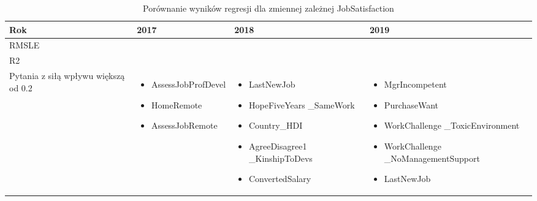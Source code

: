 \noindent\begin{minipage}{\textwidth}
             \begin{table}[H]
                 \raggedright\caption{Porównanie wyników regresji dla zmiennej zależnej JobSatisfaction\label{tabela:JobSatisfactionRegression}}
                 \begin{center}
                     \begin{tabular}{|P{.1\textwidth}|P{.26\textwidth}|P{.26\textwidth}|P{.26\textwidth}|}

                         \hline
                         Rok   & 2017             & 2018             & 2019             \\
                         \hline
                         RMSLE &  &  &  \\
                         \hline
                         R2    &    &    &    \\
                         \hline
                         Pytania z siłą wpływu większą od 0.2 &
                         \begin{itemize}
                             \item AssessJobProfDevel
                             \item HomeRemote
                             \item AssessJobRemote
                         \end{itemize} &
                         \begin{itemize}
                             \item LastNewJob
                             \item HopeFiveYears \_SameWork
                             \item Country\_HDI
                             \item AgreeDisagree1 \_KinshipToDevs
                             \item ConvertedSalary
                         \end{itemize} &
                         \begin{itemize}
                             \item MgrIncompetent
                             \item PurchaseWant
                             \item WorkChallenge \_ToxicEnvironment
                             \item WorkChallenge \_NoManagementSupport
                             \item LastNewJob
                         \end{itemize} \\
                         \hline
                     \end{tabular}
                 \end{center}
                 \raggedright\source{\ownwork}
                 \vspace{0.75cm}
             \end{table}
\end{minipage}

